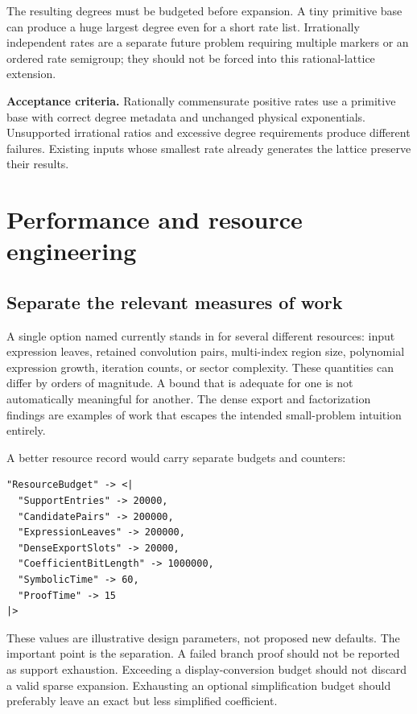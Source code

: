 \documentclass[11pt,a4paper]{article}
\newcommand{\code}[1]{\texttt{\detokenize{#1}}}
\theoremstyle{definition}
\begin{document}
The resulting degrees must be budgeted before expansion. A tiny primitive base can produce a huge largest degree even for a short rate list. Irrationally independent rates are a separate future problem requiring multiple markers or an ordered rate semigroup; they should not be forced into this rational-lattice extension.

\textbf{Acceptance criteria.} Rationally commensurate positive rates use a primitive base with correct degree metadata and unchanged physical exponentials. Unsupported irrational ratios and excessive degree requirements produce different failures. Existing inputs whose smallest rate already generates the lattice preserve their results.

\section{Performance and resource engineering}
\label{sec:performance}

\subsection{Separate the relevant measures of work}

A single option named \code{"MaxTerms"} currently stands in for several different resources: input expression leaves, retained convolution pairs, multi-index region size, polynomial expression growth, iteration counts, or sector complexity. These quantities can differ by orders of magnitude. A bound that is adequate for one is not automatically meaningful for another. The dense export and factorization findings are examples of work that escapes the intended small-problem intuition entirely.\cite{core,incremental,fourier,flat,native,envelopes}

A better resource record would carry separate budgets and counters:
\begin{lstlisting}
"ResourceBudget" -> <|
  "SupportEntries" -> 20000,
  "CandidatePairs" -> 200000,
  "ExpressionLeaves" -> 200000,
  "DenseExportSlots" -> 20000,
  "CoefficientBitLength" -> 1000000,
  "SymbolicTime" -> 60,
  "ProofTime" -> 15
|>
\end{lstlisting}
These values are illustrative design parameters, not proposed new defaults. The important point is the separation. A failed branch proof should not be reported as support exhaustion. Exceeding a display-conversion budget should not discard a valid sparse expansion. Exhausting an optional simplification budget should preferably leave an exact but less simplified coefficient.
\end{document}
